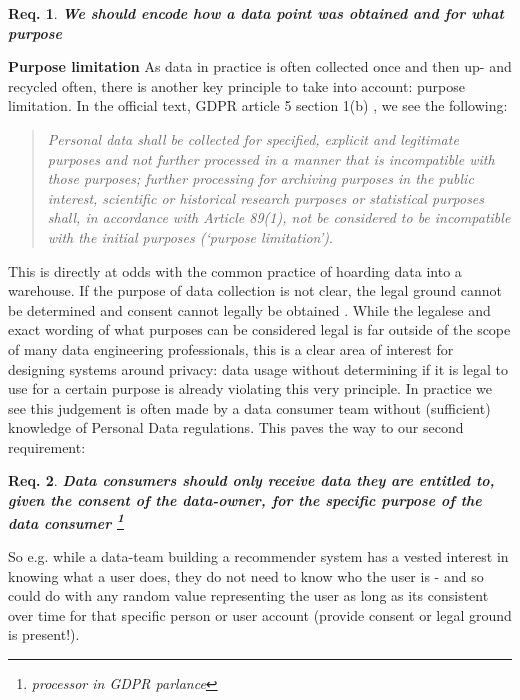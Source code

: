 \documentclass[11pt]{article} %
\newtheorem{requirement}{Req.}
\begin{document}
\begin{requirement}
\textit{\textbf{We should encode how a data point was obtained and for what purpose}}
\end{requirement}

\textbf{Purpose limitation}
As data in practice is often collected once and then up- and recycled often, there is another key principle to take into account: purpose limitation. In the official text, GDPR article 5 section 1(b) \cite{GDPR}, we see the following:

\begin{quote}
    \textit{Personal data shall be collected for specified, explicit and legitimate purposes and not further processed in a manner that is incompatible with those purposes; further processing for archiving purposes in the public interest, scientific or historical research purposes or statistical purposes shall, in accordance with Article 89(1), not be considered to be incompatible with the initial purposes (‘purpose limitation’)}.
\end{quote}

This is directly at odds with the common practice of hoarding data into a warehouse. If the purpose of data collection is not clear, the legal ground cannot be determined and consent cannot legally be obtained \cite{soria2016big}. While the legalese and exact wording of what purposes can be considered legal is far outside of the scope of many data engineering professionals, this is a clear area of interest for designing systems around privacy: data usage without determining if it is legal to use for a certain purpose is already violating this very principle. In practice we see this judgement is often made by a data consumer team without (sufficient) knowledge of Personal Data regulations. This paves the way to our second requirement: 

\begin{requirement}
\textit{\textbf{Data consumers should only receive data they are entitled to, given the consent of the data-owner, for the specific purpose of the data consumer \footnote{processor in GDPR parlance}}}
\end{requirement}

So e.g. while a data-team building a recommender system has a vested interest in knowing what a user does, they do not need to know who the user is - and so could do with any random value representing the user as long as its consistent over time for that specific person or user account (provide consent or legal ground is present!). 
\end{document}
